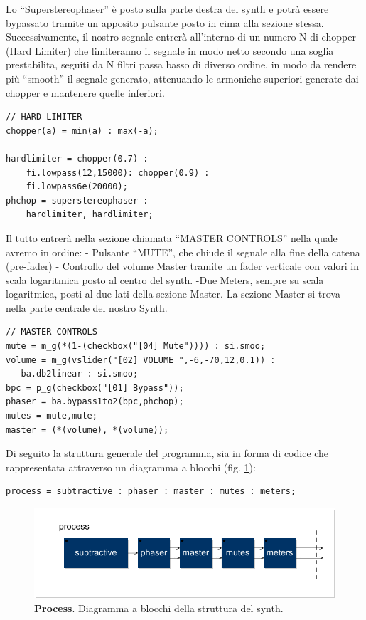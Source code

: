 \documentclass[
	a4paper,
	twocolumn
	]{article}
\begin{document}
Lo “Superstereophaser” è posto sulla parte destra del synth e potrà essere bypassato tramite un apposito pulsante posto in cima alla sezione stessa.
Successivamente, il nostro segnale entrerà all’interno di un numero N di chopper (Hard Limiter) che limiteranno il segnale in modo netto secondo una soglia prestabilita, seguiti da N filtri passa basso di diverso ordine, in modo da rendere più “smooth” il segnale generato, attenuando le armoniche superiori generate dai chopper e mantenere quelle inferiori.

\begin{lstlisting}
// HARD LIMITER
chopper(a) = min(a) : max(-a);

hardlimiter = chopper(0.7) :
	fi.lowpass(12,15000): chopper(0.9) :
	fi.lowpass6e(20000);
phchop = superstereophaser :
	hardlimiter, hardlimiter;
 \end{lstlisting}

Il tutto entrerà nella sezione chiamata “MASTER CONTROLS” nella quale avremo in ordine:
- Pulsante “MUTE”, che chiude il segnale alla fine della catena (pre-fader)
- Controllo del volume Master tramite un fader verticale con valori in scala logaritmica posto al centro del synth.
-Due Meters, sempre su scala logaritmica, posti al due lati della sezione Master.
La sezione Master si trova nella parte centrale del nostro Synth.

\begin{lstlisting}
// MASTER CONTROLS
mute = m_g(*(1-(checkbox("[04] Mute")))) : si.smoo;
volume = m_g(vslider("[02] VOLUME ",-6,-70,12,0.1)) :
   ba.db2linear : si.smoo;
bpc = p_g(checkbox("[01] Bypass"));
phaser = ba.bypass1to2(bpc,phchop);
mutes = mute,mute;
master = (*(volume), *(volume));
\end{lstlisting}

Di seguito la struttura generale del programma, sia in forma di codice che
rappresentata attraverso un diagramma a blocchi (fig. \ref{process}):

\begin{lstlisting}
process = subtractive : phaser : master : mutes : meters;
\end{lstlisting}

\begin{figure}[h]
\begin{center}
\includegraphics[width=.47\textwidth]{img/process}
\caption{\textbf{Process}. Diagramma a blocchi della struttura del synth.}
\label{process}
\end{center}
\end{figure}
\end{document}
